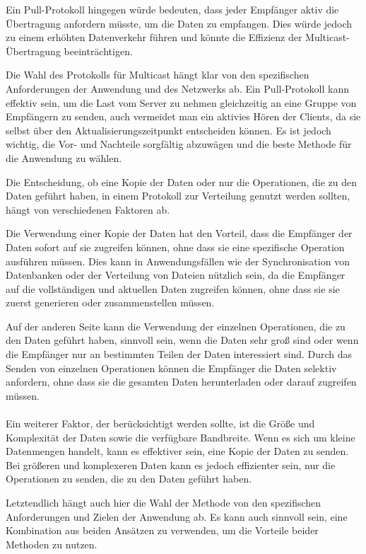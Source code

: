 \documentclass[../vs-script-first-v01.tex]{subfiles}
\begin{document}
Ein Pull-Protokoll hingegen würde bedeuten, dass jeder Empfänger aktiv die Übertragung anfordern müsste, um die Daten zu empfangen. Dies würde jedoch zu einem erhöhten Datenverkehr führen und könnte die Effizienz der Multicast-Übertragung beeinträchtigen.

Die Wahl des Protokolls für Multicast hängt klar von den spezifischen Anforderungen der Anwendung und des Netzwerks ab. Ein Pull-Protokoll kann effektiv sein, um die Last vom Server zu nehmen gleichzeitig an eine Gruppe von Empfängern zu senden, auch vermeidet man ein aktivies Hören der Clients, da sie selbst über den Aktualisierungszeitpunkt entscheiden können. Es ist jedoch wichtig, die Vor- und Nachteile sorgfältig abzuwägen und die beste Methode für die Anwendung zu wählen.

Die Entscheidung, ob eine Kopie der Daten oder nur die Operationen, die zu den Daten geführt haben, in einem Protokoll zur Verteilung genutzt werden sollten, hängt von verschiedenen Faktoren ab.

Die Verwendung einer Kopie der Daten hat den Vorteil, dass die Empfänger der Daten sofort auf sie zugreifen können, ohne dass sie eine spezifische Operation ausführen müssen. Dies kann in Anwendungsfällen wie der Synchronisation von Datenbanken oder der Verteilung von Dateien nützlich sein, da die Empfänger auf die vollständigen und aktuellen Daten zugreifen können, ohne dass sie sie zuerst generieren oder zusammenstellen müssen.

Auf der anderen Seite kann die Verwendung der einzelnen Operationen, die zu den Daten geführt haben, sinnvoll sein, wenn die Daten sehr groß sind oder wenn die Empfänger nur an bestimmten Teilen der Daten interessiert sind. Durch das Senden von einzelnen Operationen können die Empfänger die Daten selektiv anfordern, ohne dass sie die gesamten Daten herunterladen oder darauf zugreifen müssen.
\\\\
Ein weiterer Faktor, der berücksichtigt werden sollte, ist die Größe und Komplexität der Daten sowie die verfügbare Bandbreite. Wenn es sich um kleine Datenmengen handelt, kann es effektiver sein, eine Kopie der Daten zu senden. Bei größeren und komplexeren Daten kann es jedoch effizienter sein, nur die Operationen zu senden, die zu den Daten geführt haben.

Letztendlich hängt auch hier die Wahl der Methode von den spezifischen Anforderungen und Zielen der Anwendung ab. Es kann auch sinnvoll sein, eine Kombination aus beiden Ansätzen zu verwenden, um die Vorteile beider Methoden zu nutzen.
\end{document}
